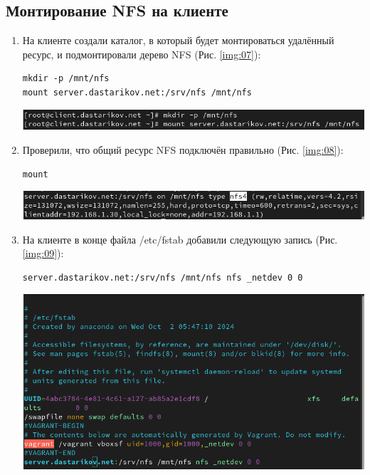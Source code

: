 \subsection{Монтирование NFS на клиенте}
\begin{enumerate}
\item На клиенте создали каталог, в который будет монтироваться удалённый ресурс, и подмонтировали дерево NFS (Рис. \ref{img:07}):
    \begin{verbatim}
mkdir -p /mnt/nfs
mount server.dastarikov.net:/srv/nfs /mnt/nfs
    \end{verbatim}

\begin{center}
    \centering
    \includegraphics[width=\textwidth]{../images/image07.png}
    \label{img:07}
\end{center}

\item Проверили, что общий ресурс NFS подключён правильно (Рис. \ref{img:08}):
    \begin{verbatim}
mount
    \end{verbatim}

\begin{center}
    \centering
    \includegraphics[width=\textwidth]{../images/image08.png}
    \label{img:08}
\end{center}

\item На клиенте в конце файла /etc/fstab добавили следующую запись (Рис. \ref{img:09}):
    \begin{verbatim}
server.dastarikov.net:/srv/nfs /mnt/nfs nfs _netdev 0 0
    \end{verbatim}

\begin{center}
    \centering
    \includegraphics[width=\textwidth]{../images/image09.png}
    \label{img:09}
\end{center}


\end{enumerate}

